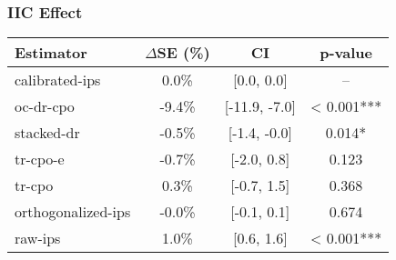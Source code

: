 \subsubsection{IIC Effect}
\begin{tabular}{l|ccc}
\toprule
Estimator & $\Delta$SE (\%) & CI & p-value \\
\midrule
calibrated-ips & 0.0\% & [0.0, 0.0] & -- \\
oc-dr-cpo & -9.4\% & [-11.9, -7.0] & < 0.001*** \\
stacked-dr & -0.5\% & [-1.4, -0.0] & 0.014* \\
tr-cpo-e & -0.7\% & [-2.0, 0.8] & 0.123 \\
tr-cpo & 0.3\% & [-0.7, 1.5] & 0.368 \\
orthogonalized-ips & -0.0\% & [-0.1, 0.1] & 0.674 \\
raw-ips & 1.0\% & [0.6, 1.6] & < 0.001*** \\
\bottomrule
\end{tabular}